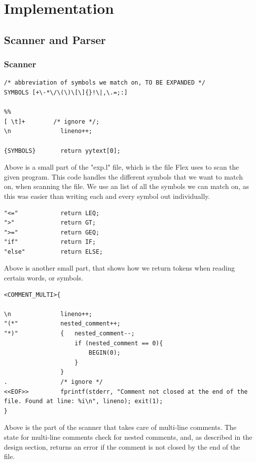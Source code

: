 \documentclass[a4paper,10pt,titlepage]{report}
\begin{document}
\newpage

\section{Implementation}
\subsection{Scanner and Parser}
\subsubsection{Scanner}

\begin{lstlisting}
/* abbreviation of symbols we match on, TO BE EXPANDED */
SYMBOLS [+\-*\/\(\)\[\]{}!\|,\.=;:]

%%
[ \t]+        /* ignore */;
\n              lineno++;

{SYMBOLS}       return yytext[0];
\end{lstlisting}
Above is a small part of the "exp.l" file, which is the file Flex uses to scan the given program. This code handles the different symbols that we want to match on, when scanning the file. We use an list of all the symbols we can match on, as this was easier than writing each and every symbol out individually.

\begin{lstlisting}
"<="            return LEQ;
">"             return GT;
">="            return GEQ;
"if"            return IF;
"else"          return ELSE;
\end{lstlisting}
Above is another small part, that shows how we return tokens when reading certain words, or symbols.

\begin{lstlisting}
<COMMENT_MULTI>{

\n              lineno++;
"(*"            nested_comment++;
"*)"            {   nested_comment--;
                    if (nested_comment == 0){
                        BEGIN(0);
                    }
                }
.               /* ignore */
<<EOF>>         fprintf(stderr, "Comment not closed at the end of the file. Found at line: %i\n", lineno); exit(1);
}
\end{lstlisting}
Above is the part of the scanner that takes care of multi-line comments. The state for multi-line comments check for nested comments, and, as described in the design section, returns an error if the comment is not closed by the end of the file.
\end{document}
